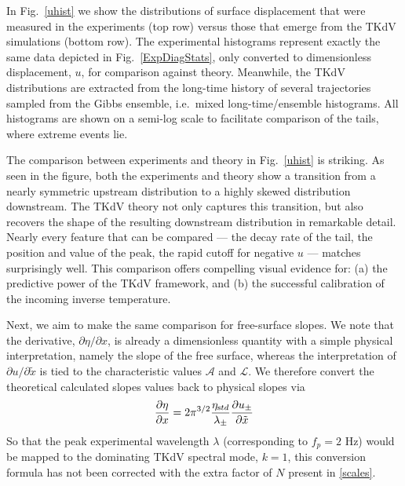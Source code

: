 \documentclass[11pt]{article}
\newcommand{\pd}[2]    { \frac{\partial #1} {\partial #2} }
\newcommand{\freqp}{f_p}
\newcommand{\etastd}{\eta_{\text std}}
\newcommand{\lam}{\lambda}
\newcommand{\lamupdn}{\lam_{\pm}}
\newcommand{\lamfac}{N}
\newcommand{\ampscale}{\mathcal{A}}
\newcommand{\lengthscale}{\mathcal{L}}
\newcommand{\uupdn}{u_{\pm}}
\begin{document}
	In Fig.~\ref{uhist} we show the distributions of surface displacement that were measured in the experiments (top row) versus those that emerge from the TKdV simulations (bottom row). The experimental histograms represent exactly the same data depicted in Fig.~\ref{ExpDiagStats}, only converted to dimensionless displacement, $u$, for comparison against theory. Meanwhile, the TKdV distributions are extracted  from the long-time history of several trajectories sampled from the Gibbs ensemble, i.e.~mixed long-time/ensemble histograms. All histograms are shown on a semi-log scale to facilitate comparison of the tails, where extreme events lie.

	The comparison between experiments and theory in Fig.~\ref{uhist} is striking. As seen in the figure, both the experiments and theory show a transition from a nearly symmetric upstream distribution to a highly skewed distribution downstream. The TKdV theory not only captures this transition, but also recovers the shape of the resulting downstream distribution in remarkable detail. Nearly every feature that can be compared --- the decay rate of the tail, the position and value of the peak, the rapid cutoff for negative $u$ --- matches surprisingly well. This comparison offers compelling visual evidence for: (a) the predictive power of the TKdV framework, and (b) the successful calibration of the incoming inverse temperature.


	Next, we aim to make the same comparison for free-surface slopes. We note that the derivative, $\partial \eta / \partial x$, is already a dimensionless quantity with a simple physical interpretation, namely the slope of the free surface, whereas the interpretation of $\partial u/\partial \tilde{x}$ is tied to the characteristic values $\ampscale$ and $\lengthscale$.  
We therefore convert the theoretical calculated slopes values back to physical slopes via
\begin{equation}
\pd{\eta}{x} = 2 \pi^{3/2} \frac{\etastd}{\lamupdn} \pd{\uupdn}{\tilde{x}}
\end{equation}
So that the peak experimental wavelength $\lam$ (corresponding to $\freqp = 2$ Hz) would be mapped to the dominating TKdV spectral mode, $k = 1$,  this conversion formula has not been corrected with the extra factor of $\lamfac$ present in \eqref{scales}.
 
\end{document}
